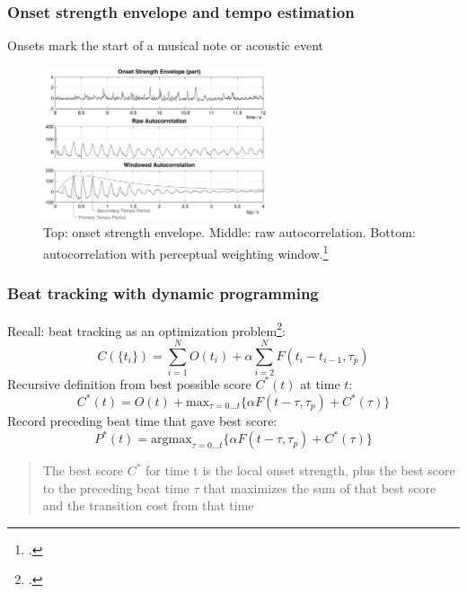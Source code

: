 \documentclass{beamer}
\begin{document}
\begin{frame}
	\frametitle{Onset strength envelope and tempo estimation}
	Onsets mark the start of a musical note or acoustic event
	\begin{figure}
		\includegraphics[height=4.5cm]{./onset2.png}
		\caption{Top: onset strength envelope. Middle: raw autocorrelation. Bottom: autocorrelation with perceptual weighting window.\footcite{ellis}}
	\end{figure}
\end{frame}


\begin{frame}
	\frametitle{Beat tracking with dynamic programming}
	Recall: beat tracking as an optimization problem\footcite{ellis}:
	\[ C(\{t_{i}\}) = \sum_{i=1}^{N}O(t_{i}) + \alpha\sum_{i=2}^{N}F(t_{i}-t_{i-1}, \tau_{p}) \]
	Recursive definition from best possible score $C^{*}(t)$ at time $t$:
	\[ C^{*}(t) = O(t) + \text{max}_{\tau = 0...t}\{\alpha F(t-\tau, \tau_{p}) + C^{*}(\tau)\} \]
	Record preceding beat time that gave best score:
	\[ P^{*}(t) = \text{argmax}_{\tau = 0...t} \{\alpha F(t-\tau, \tau_{p}) + C^{*}(\tau)\} \]
	\begin{quote}
	The best score $C^{*}$ for time t is the local onset strength, plus the best score to the preceding beat time $\tau$ that maximizes the sum of that best score and the transition cost from that time
	\end{quote}
\end{frame}
\end{document}
